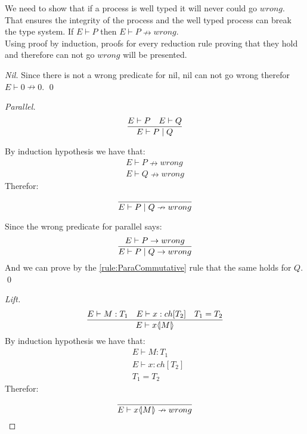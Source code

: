 \begin{theorem}
We need to show that if a process is well typed it will never could go $wrong$. That ensures the integrity of the process and the well typed process can break the type system.
    If $E \vdash P$ then $E \vdash P \nrightarrow wrong$.\\
    Using proof by induction, proofs for every reduction rule proving that they hold and therefore can not go $wrong$ will be presented.

    \begin{proof}[Nil]
        Since there is not a wrong predicate for nil, nil can not go wrong therefor $E \vdash 0 \nrightarrow 0$.
        \qed
    \end{proof}

    \begin{proof}[Parallel]
        \begin{align*}
            \frac{E \vdash P \quad E \vdash Q }{E \vdash P \mid Q}
        \end{align*}

        By induction hypothesis we have that: 
        \begin{align*}
            E \vdash P \nrightarrow wrong\\
            E \vdash Q \nrightarrow wrong
        \end{align*}
        Therefor:
        \begin{align*}
            \frac{}{E \vdash P \mid Q \nrightarrow wrong}
        \end{align*}

        Since the wrong predicate for parallel says:
        \begin{align*}
            \frac{E \vdash P \rightarrow wrong}{E \vdash P \mid Q \rightarrow wrong}
        \end{align*}
        And we can prove by the \ref{rule:ParaCommutative} rule that the same holds for $Q$.\\
        \qed
    \end{proof}

    \begin{proof}[Lift]
        \begin{align*}
            \frac{E \vdash M:T_1 \quad E \vdash x:ch[T_2] \quad T_1 = T_2}{E \vdash x \langle \! | M | \! \rangle}
        \end{align*}
        By induction hypothesis we have that:
        \begin{align*}
            &E \vdash M:T_1\\
            &E \vdash x:ch[T_2]\\
            &T_1 = T_2
        \end{align*}
        Therefor:
        \begin{align*}
            \frac{}{E \vdash x \langle \! | M | \! \rangle \nrightarrow wrong}
        \end{align*}


\end{proof}
\end{theorem}
